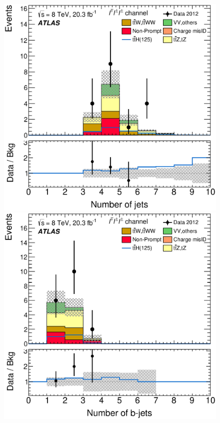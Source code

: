 \begin{figure}[!htbp]
  \begin{minipage}[h]{0.4\textwidth}
    \centering \includegraphics[width=\textwidth]{figs/results/results_new/3lep_SR_NJet}
  \end{minipage}\hfill
  \begin{minipage}[h]{0.4\textwidth}
    \centering \includegraphics[width=\textwidth]{figs/results/results_new/3lep_SR_NJetBTag}

\end{minipage}
\end{figure}
